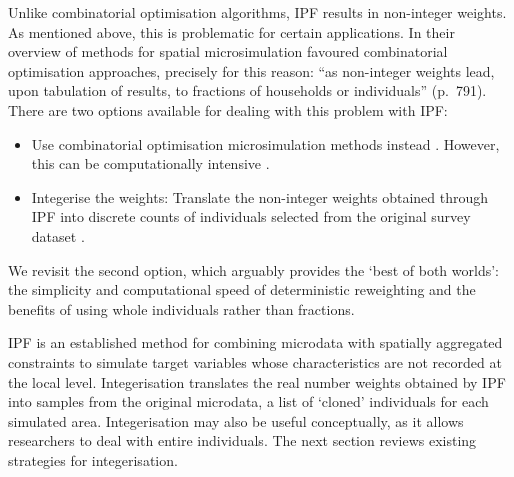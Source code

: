 Unlike combinatorial optimisation algorithms, IPF results in non-integer
weights. As mentioned above, this is problematic for certain applications.
In their overview of methods for spatial microsimulation
\citet{Williamson1998} favoured combinatorial
optimisation approaches, precisely for this reason:
``as non-integer weights lead, upon tabulation of results, to fractions of
households or individuals'' (p.\ 791). There are two options
available for dealing with this problem with IPF:
\begin{itemize}
\item Use combinatorial optimisation microsimulation methods instead
\citep{Williamson1998}. However, this can be computationally intensive
\citep{Pritchard2012}.
\item Integerise the weights: Translate the non-integer weights obtained
through IPF into discrete counts of individuals selected from the original
survey dataset \citep{Ballas2005c}.
\end{itemize}
We revisit the second option, which arguably provides the
`best of both worlds': the simplicity and computational speed of deterministic
reweighting and the benefits of using whole individuals rather than fractions.

IPF is an established method for combining microdata
with spatially aggregated constraints to simulate  target variables whose
characteristics are not recorded at the local level. Integerisation translates
the real number weights obtained by IPF into samples from the original
microdata, a list of `cloned' individuals for each simulated area.
Integerisation may also be useful conceptually, as it allows
researchers to deal with entire individuals. The next section
reviews existing strategies for integerisation.

